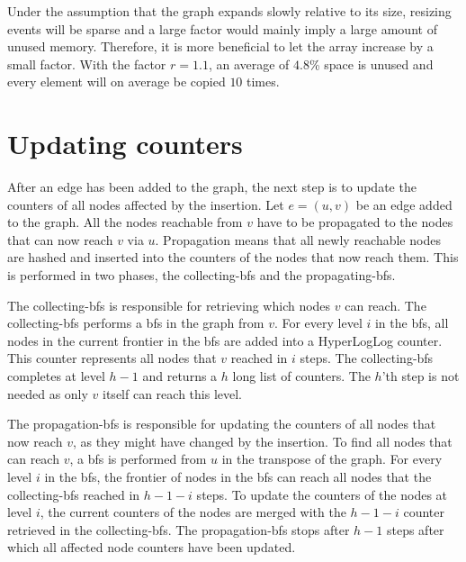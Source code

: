 Under the assumption that the graph expands slowly relative to its size, resizing events will be sparse and a large factor would mainly imply a large amount of unused memory. Therefore, it is more beneficial to let the array increase by a small factor. With the factor $r = 1.1$, an average of $4.8$\% space is unused and every element will on average be copied $10$ times.

\section{Updating counters}

After an edge has been added to the graph, the next step is to update the counters of all nodes affected by the insertion. Let $e = (u,v)$ be an edge added to the graph. All the nodes reachable from $v$ have to be propagated to the nodes that can now reach $v$ via $u$. Propagation means that all newly reachable nodes are hashed and inserted into the counters of the nodes that now reach them. This is performed in two phases, the collecting-bfs and the propagating-bfs.

The collecting-bfs is responsible for retrieving which nodes $v$ can reach. The collecting-bfs performs a bfs in the graph from $v$. For every level $i$ in the bfs, all nodes in the current frontier in the bfs are added into a HyperLogLog counter. This counter represents all nodes that $v$ reached in $i$ steps. The collecting-bfs completes at level $h-1$ and returns a $h$ long list of counters. The $h$'th step is not needed as only $v$ itself can reach this level.

The propagation-bfs is responsible for updating the counters of all nodes that now reach $v$, as they might have changed by the insertion. To find all nodes that can reach $v$, a bfs is performed from $u$ in the transpose of the graph. For every level $i$ in the bfs, the frontier of nodes in the bfs can reach all nodes that the collecting-bfs reached in $h-1-i$ steps. To update the counters of the nodes at level $i$, the current counters of the nodes are merged with the $h-1-i$ counter retrieved in the collecting-bfs. The propagation-bfs stops after $h-1$ steps after which all affected node counters have been updated.


